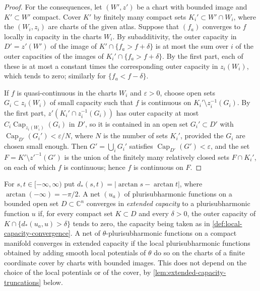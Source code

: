 \begin{proof}
For the consequences, let $(W',z')$ be a chart with bounded image and $K'\subset W'$ compact. Cover $K'$ by finitely many compact sets $K_i'\subset W'\cap W_i$, where the $(W_i,z_i)$ are charts of the given atlas. Suppose that $(f_a)$ converges to $f$ locally in capacity in the charts $W_i$. By subadditivity, the outer capacity in $D'=z'(W')$ of the image of $K'\cap\{f_a>f+\delta\}$ is at most the sum over $i$ of the outer capacities of the images of $K_i'\cap\{f_a>f+\delta\}$. By the first part, each of these is at most a constant times the corresponding outer capacity in $z_i(W_i)$, which tends to zero; similarly for $\{f_a<f-\delta\}$.

If $f$ is quasi-continuous in the charts $W_i$ and $\varepsilon>0$, choose open sets $G_i\subset z_i(W_i)$ of small capacity such that $f$ is continuous on $K_i'\setminus z_i^{-1}(G_i)$. By the first part, $z'(K_i'\cap z_i^{-1}(G_i))$ has outer capacity at most $C_i\operatorname{Cap}_{z_i(W_i)}(G_i)$ in $D'$, so it is contained in an open set $G_i'\subset D'$ with $\operatorname{Cap}_{D'}(G_i')<\varepsilon/N$, where $N$ is the number of sets $K_i'$, provided the $G_i$ are chosen small enough. Then $G'=\bigcup_iG_i'$ satisfies $\operatorname{Cap}_{D'}(G')<\varepsilon$, and the set $F=K'\setminus z'^{-1}(G')$ is the union of the finitely many relatively closed sets $F\cap K_i'$, on each of which $f$ is continuous; hence $f$ is continuous on $F$.
\end{proof}

\begin{definition}\label{def:extended-psh-capacity-convergence}
For $s,t\in[-\infty,\infty)$ put $d_*(s,t)=|\arctan s-\arctan t|$, where $\arctan(-\infty)=-\pi/2$. A net $(u_a)$ of plurisubharmonic functions on a bounded open set $D\subset\mathbb C^n$ converges in \emph{extended capacity} to a plurisubharmonic function $u$ if, for every compact set $K\subset D$ and every $\delta>0$, the outer capacity of $K\cap\{d_*(u_a,u)>\delta\}$ tends to zero, the capacity being taken as in \cref{def:local-capacity-convergence}. A net of $\theta$-plurisubharmonic functions on a compact manifold converges in extended capacity if the local plurisubharmonic functions obtained by adding smooth local potentials of $\theta$ do so on the charts of a finite coordinate cover by charts with bounded images. This does not depend on the choice of the local potentials or of the cover, by \cref{lem:extended-capacity-truncations} below.
\end{definition}

